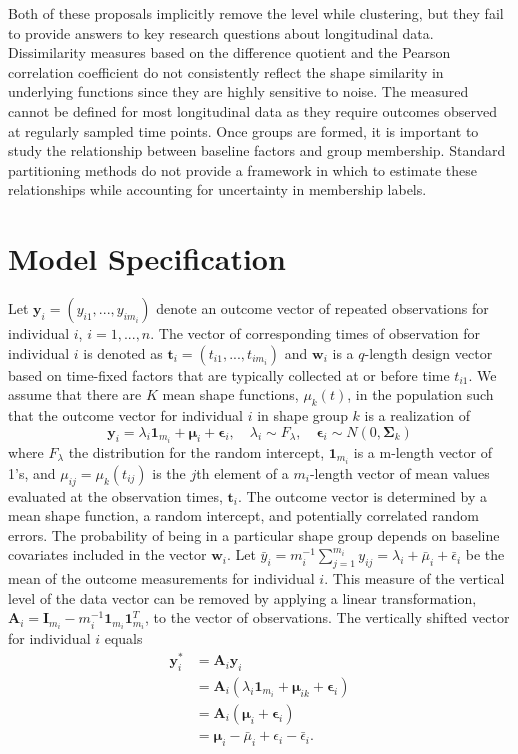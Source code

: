 \documentclass[12pt]{article}
\newcommand{\B}[0]{\mathbf}
\newcommand{\BS}[0]{\boldsymbol}
\begin{document}
Both of these proposals implicitly remove the level while clustering, but they fail to provide answers to key research questions about longitudinal data. Dissimilarity measures based on the difference quotient and the Pearson correlation coefficient do not consistently reflect the shape similarity in underlying functions since they are highly sensitive to noise. The measured cannot be defined for most longitudinal data as they require outcomes observed at regularly sampled time points. Once groups are formed, it is important to study the relationship between baseline factors and group membership. Standard partitioning methods do not provide a framework in which to estimate these relationships while accounting for uncertainty in membership labels.  

\section{Model Specification}
 Let $\B y_{i}=(y_{i1},...,y_{im_{i}})$ denote an outcome vector of repeated observations for individual $i$, $i=1,...,n$. The vector of corresponding times of observation for individual $i$ is denoted as $\B t_{i}=(t_{i1},...,t_{im_{i}})$ and $\B w_{i}$ is a $q$-length design vector based on time-fixed factors that are typically collected at or before time $t_{i1}$. We assume that there are $K$ mean shape functions, $\mu_{k}(t)$, in the population such that the outcome vector for individual $i$ in shape group $k$ is a realization of
 $$\B y_{i} = \lambda_{i}\B 1_{m_{i}}+\BS\mu_{i}+\BS\epsilon_{i},\quad \lambda_{i}\sim F_{\lambda}, \quad \BS\epsilon_{i}\sim N(0,\BS\Sigma_{k})$$
 where $F_{\lambda}$ the distribution for the random intercept, $\B 1_{m_{i}}$ is a m-length vector of 1's, and $\mu_{ij} = \mu_{k}(t_{ij})$ is the $j$th element of a $m_{i}$-length vector of mean values evaluated at the observation times, $\B t_{i}$. The outcome vector is determined by a mean shape function, a random intercept, and potentially correlated random errors. The probability of being in a particular shape group depends on baseline covariates included in the vector $\B w_{i}$. Let $\bar{y}_{i}= m_{i}^{-1}\sum^{m_{i}}_{j=1} y_{ij} = \lambda_{i}+\bar{\mu}_{i}+\bar{\epsilon}_{i}$ be the mean of the outcome measurements for individual $i$. This measure of the vertical level of the data vector can be removed by applying a linear transformation, $\B A_{i} = \B I_{m_{i}} - m_{i}^{-1}\B 1_{m_{i}}\B 1_{m_{i}}^{T}$, to the vector of observations. The vertically shifted vector for individual $i$ equals 
\begin{align*}
\B y^{*}_{i} &= \B A_{i}\B y_{i}\\
&=\B A_{i}(\lambda_{i}\B 1_{m_{i}}+\BS\mu_{ik}+\BS\epsilon_{i})\\
&=\B A_{i}(\BS\mu_{i}+\BS\epsilon_{i})\\
&=\BS\mu_{i} - \bar{\mu}_{i}+\epsilon_{i}-\bar{\epsilon}_{i}.
\end{align*}
\end{document}

